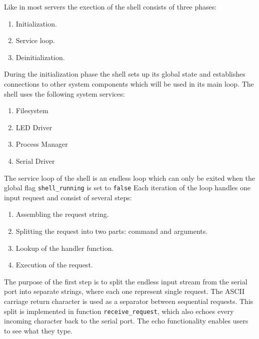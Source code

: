 \documentclass[a4paper,10pt]{article}
\newcommand{\todoref}{\todo{ref}}
\begin{document}
Like in most servers the exection of the shell consists of three phases:
\begin{enumerate}
	\item Initialization.
	\item Service loop.
	\item Deinitialization.
\end{enumerate}

During the initialization phase the shell sets up its global state and establishes connections to other system components which will be used in its main loop.
The shell uses the following system services:
\begin{enumerate}
	\item Filesystem
	\item LED Driver
	\item Process Manager
	\item Serial Driver
\end{enumerate}

The service loop of the shell is an endless loop which can only be exited when the global flag \lstinline!shell_running! is set to \lstinline!false!
Each iteration of the loop handles one input request and consist of several steps:
\begin{enumerate}
	\item Assembling the request string.
	\item Splitting the request into two parts: command and arguments.
	\item Lookup of the handler function.
	\item Execution of the request.
\end{enumerate} 

The purpose of the first step is to split the endless input stream from the serial port into separate strings, where each one represent single request.
The ASCII \todoref carriage return character is used as a separator between sequential requests.
This split is implemented in function \lstinline!receive_request!, which also echoes every incoming character back to the serial port.
The echo functionality enables users to see what they type.
\end{document}
